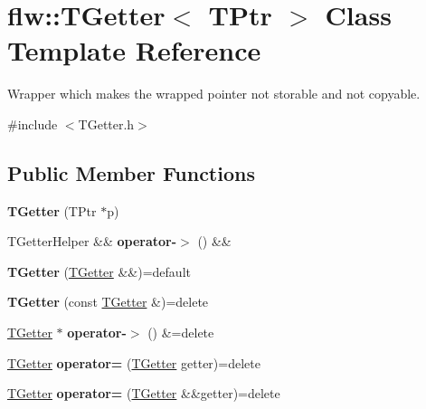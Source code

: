\hypertarget{classflw_1_1TGetter}{}\section{flw\+:\+:T\+Getter$<$ T\+Ptr $>$ Class Template Reference}
\label{classflw_1_1TGetter}


Wrapper which makes the wrapped pointer not storable and not copyable.  




{\ttfamily \#include $<$T\+Getter.\+h$>$}

\subsection*{Public Member Functions}
\begin{DoxyCompactItemize}
\item 
\mbox{\label{classflw_1_1TGetter_a756ebc5ae284108cba466609022f1812}} 
{\bfseries T\+Getter} (T\+Ptr $\ast$p)
\item 
\mbox{\label{classflw_1_1TGetter_a0c9728ad407ecbe66209e566bb8e27b2}} 
T\+Getter\+Helper \&\& {\bfseries operator-\/$>$} () \&\&
\item 
\mbox{\label{classflw_1_1TGetter_add5f91ce191abb5bbf629704d90a5a01}} 
{\bfseries T\+Getter} (\hyperlink{classflw_1_1TGetter}{T\+Getter} \&\&)=default
\item 
\mbox{\label{classflw_1_1TGetter_af0df32472acde6413b0e54e52bfa99ae}} 
{\bfseries T\+Getter} (const \hyperlink{classflw_1_1TGetter}{T\+Getter} \&)=delete
\item 
\mbox{\label{classflw_1_1TGetter_a6ac56cf6908ab887d021b5501a658339}} 
\hyperlink{classflw_1_1TGetter}{T\+Getter} $\ast$ {\bfseries operator-\/$>$} () \&=delete
\item 
\mbox{\label{classflw_1_1TGetter_abde628d0ddf0a374f955a323f243f1b7}} 
\hyperlink{classflw_1_1TGetter}{T\+Getter} {\bfseries operator=} (\hyperlink{classflw_1_1TGetter}{T\+Getter} getter)=delete
\item 
\mbox{\label{classflw_1_1TGetter_a4bd3efb6cbb6018d7303e1330b3c523f}} 
\hyperlink{classflw_1_1TGetter}{T\+Getter} {\bfseries operator=} (\hyperlink{classflw_1_1TGetter}{T\+Getter} \&\&getter)=delete
\end{DoxyCompactItemize}


